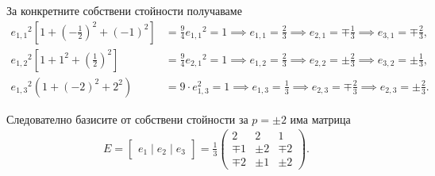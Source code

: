 \documentclass[
  headings=standardclasses,
  bibliography=totocnumbered,
]{scrartcl}
\begin{document}
\begin{solution}
  За конкретните собствени стойности получаваме
  \begin{align*}
    {e_{1,1}}^2 \left[1 + {\left( - \tfrac 1 2 \right)}^2 + {(-1)}^2 \right] &= \frac 9 4 {e_{1,1}}^2 = 1 \implies e_{1,1} = \frac 2 3 \implies e_{2,1} = \mp \frac 1 3 \implies e_{3,1} = \mp \frac 2 3,
    \\
    {e_{1,2}}^2 \left[1 + 1^2 + {\left( \frac 1 2 \right)}^2 \right] &= \frac 9 4 {e_{2,1}}^2 = 1 \implies e_{1,2} = \frac 2 3 \implies e_{2,2} = \pm \frac 2 3 \implies e_{3,2} = \pm \frac 1 3,
    \\
    {e_{1,3}}^2 \left(1 + {(-2)}^2 + 2^2 \right) &= 9 \cdot {e_{1,3}^2} = 1 \implies e_{1,3} = \frac 1 3 \implies e_{2,3} = \mp \frac 2 3 \implies e_{2,3} = \pm \frac 2 3.
  \end{align*}

  Следователно базисите от собствени стойности за \( p = \pm 2 \) има матрица
  \begin{align*}
    E = \begin{bmatrix} e_1 \mid e_2 \mid e_3 \end{bmatrix} = \frac 1 3 \begin{pmatrix}
          2 &     2 &     1 \\
      \mp 1 & \pm 2 & \mp 2 \\
      \mp 2 & \pm 1 & \pm 2
    \end{pmatrix}.
  \end{align*}


\end{solution}
\end{document}
